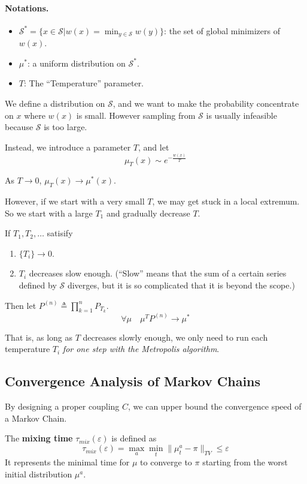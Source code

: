         \paragraph{Notations.}
        \begin{itemize}
            \item $\mathcal{S}^* = \{x\in\mathcal{S}|w(x) = \min_{y\in\mathcal{S}} w(y)\}$: the set of global minimizers of $w(x)$.
            \item $\mu^*$: a uniform distribution on $\mathcal{S}^*$.
            \item $T$: The ``Temperature'' parameter.
        \end{itemize}
        \par We define a distribution on $\mathcal{S}$, and we want to make the probability concentrate on $x$ where $w(x)$ is small. However sampling from $\mathcal{S}$ is usually infeasible because $\mathcal{S}$ is too large.
        \par Instead, we introduce a parameter $T$, and let
        \[ \mu_T(x) \sim e^{-\frac{w(x)}{T}} \]
        \begin{proposition}
            As $T \to 0$, $\mu_T(x) \to \mu^*(x)$.
        \end{proposition}
        \par However, if we start with a very small $T$, we may get stuck in a local extremum. So we start with a large $T_1$ and gradually decrease $T$.
        \begin{theorem}
            If $T_1,T_2,\dots$ satisify
            \begin{enumerate}
                \item $\{T_i\} \to 0$.
                \item $T_i$ decreases slow enough. (``Slow'' means that the sum of a certain series defined by $\mathcal{S}$ diverges, but it is so complicated that it is beyond the scope.)
            \end{enumerate}
            Then let $P^{(n)} \triangleq \prod_{k=1}^n P_{T_k}$.
            \[ \forall \mu \quad \mu^TP^{(n)} \to \mu^* \]
        \end{theorem}
        That is, as long as $T$ decreases slowly enough, we only need to run each temperature $T_i$ \emph{for one step with the Metropolis algorithm}.

    \subsection{Convergence Analysis of Markov Chains}
        By designing a proper coupling $C$, we can upper bound the convergence speed of a Markov Chain.
        \begin{definition}\label{def:MixingTime}
            The \textbf{mixing time} $\tau_{mix}(\varepsilon)$ is defined as
            \[ \tau_{mix}(\varepsilon) = \max_{a} \min_{t} \| \mu_t^a - \pi \|_{TV} \le \varepsilon \]
            It represents the minimal time for $\mu$ to converge to $\pi$ starting from the worst initial distribution $\mu^a$.
        \end{definition}

